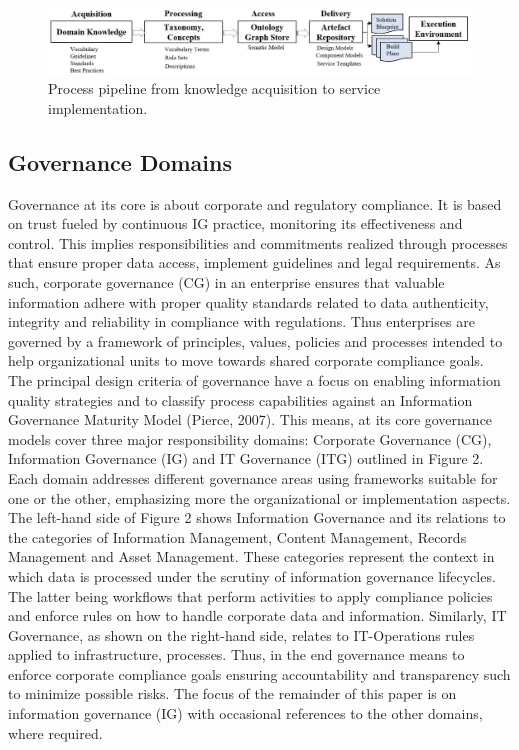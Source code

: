 \begin{figure}[!hbtp]
  \centering
   \includegraphics[width=\textwidth]{images/Fig1-Processpipe.png}
    \caption{Process pipeline from knowledge acquisition to service implementation.}
  \label{fig:procpipe}
\end{figure}
\subsection{{Governance Domains}}
Governance at its core is about corporate and regulatory compliance. It is based on trust fueled by continuous IG practice, monitoring its effectiveness and control. This implies responsibilities and commitments realized through processes that ensure proper data access, implement guidelines and legal requirements. As such, corporate governance (CG) in an enterprise ensures that valuable information adhere with proper quality standards related to data authenticity, integrity and reliability in compliance with regulations. Thus enterprises are governed by a framework of principles, values, policies and processes intended to help organizational units to move towards shared corporate compliance goals. 
The principal design criteria of governance have a focus on enabling information quality strategies and to classify process capabilities against an Information Governance Maturity Model (Pierce, 2007). This means, at its core governance models cover three major responsibility domains: Corporate Governance (CG), Information Governance (IG) and IT Governance (ITG) outlined in Figure 2. Each domain addresses different governance areas using frameworks suitable for one or the other, emphasizing more the organizational or implementation aspects. 
The left-hand side of Figure 2 shows Information Governance and its relations to the categories of Information Management, Content Management, Records Management and Asset Management. These categories represent the context in which data is processed under the scrutiny of information governance lifecycles. The latter being workflows that perform activities to apply compliance policies and enforce rules on how to handle corporate data and information. Similarly, IT Governance, as shown on the right-hand side, relates to IT-Operations rules applied to infrastructure, processes. Thus, in the end governance means to enforce corporate compliance goals ensuring accountability and transparency such to minimize possible risks. 
The focus of the remainder of this paper is on information governance (IG) with occasional references to the other domains, where required.

